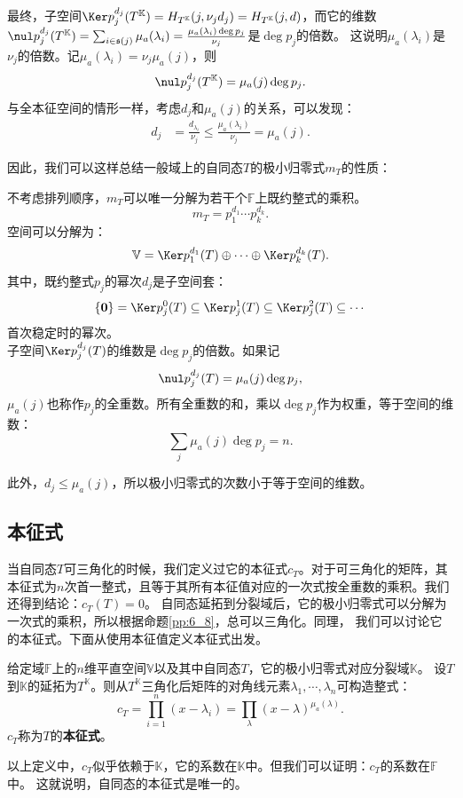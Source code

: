 \documentclass[12pt,UTF8]{ctexbook}
\begin{document}
最终，子空间$\Ker p_j^{d_j}(T^{\mathbb{K}}) = H_{T^{\mathbb{K}}}(j, \nu_j d_j) = H_{T^{\mathbb{K}}}(j, d)$，而它的维数
$\nul p_j^{d_j}(T^{\mathbb{K}}) = \sum_{i\in \mathfrak{s}(j)} \mu_a(\lambda_i) = \frac{\mu_a(\lambda_i) \deg p_j}{\nu_j} $是$\deg p_j$的倍数。
这说明$\mu_a(\lambda_i)$是$\nu_j$的倍数。记$\mu_a(\lambda_i) = \nu_j \mu_a(j)$，则
$$ \nul p_j^{d_j}(T^{\mathbb{K}}) = \mu_a(j) \deg p_j. $$
与全本征空间的情形一样，考虑$d_j$和$\mu_a(j)$的关系，可以发现：
\begin{align*}
    d_j &= \frac{d_{\lambda_i}}{\nu_j} \leqslant \frac{\mu_a(\lambda_i)}{\nu_j} = \mu_a(j).  
\end{align*}

因此，我们可以这样总结一般域上的自同态$T$的极小归零式$m_T$的性质：
\begin{pp}\label{pp:9_7_1}
不考虑排列顺序，$m_T$可以唯一分解为若干个$\mathbb{F}$上既约整式的乘积。
$$ m_T = p_1^{d_1}\cdots p_k^{d_k}.$$
空间可以分解为：
$$ \mathbb{V} = \Ker p_1^{d_1}(T) \oplus \cdots \oplus \Ker p_k^{d_k}(T). $$
其中，既约整式$p_j$的幂次$d_j$是子空间套：
$$ \{\mathbf{0}\} = \Ker p_j^{0}(T) \subseteq \Ker p_j^{1}(T) \subseteq \Ker p_j^{2}(T) \subseteq \cdots $$
首次稳定时的幂次。\\
子空间$\Ker p_j^{d_j}(T)$的维数是$\deg p_j$的倍数。如果记
$$ \nul p_j^{d_j}(T) = \mu_a(j) \deg p_j, $$
$\mu_a(j)$也称作$p_j$的全重数。所有全重数的和，乘以$\deg p_j$作为权重，等于空间的维数：
$$ \sum_j \mu_a(j) \deg p_j = n . $$
\end{pp}

此外，$d_j  \leqslant \mu_a(j) $，所以极小归零式的次数小于等于空间的维数。

\subsection{本征式}
当自同态$T$可三角化的时候，我们定义过它的本征式$c_T$。对于可三角化的矩阵，其本征式为$n$次首一整式，且等于其所有本征值对应的一次式按全重数的乘积。我们还得到结论：$c_T(T) = 0$。
自同态延拓到分裂域后，它的极小归零式可以分解为一次式的乘积，所以根据命题\ref{pp:6_8}，总可以三角化。同理，
我们可以讨论它的本征式。下面从使用本征值定义本征式出发。

\begin{df}\label{df:9_5}
    给定域$\mathbb{F}$上的$n$维平直空间$\mathbb{V}$以及其中自同态$T$，它的极小归零式对应分裂域$\mathbb{K}$。
    设$T$到$\mathbb{K}$的延拓为$T^{\mathbb{K}}$。则从$T^{\mathbb{K}}$三角化后矩阵的对角线元素$\lambda_1, \cdots , \lambda_n$可构造整式：
    $$ c_T = \prod_{i=1}^n (x - \lambda_i) = \prod_{\lambda} (x - \lambda)^{\mu_a(\lambda)}.$$
    $c_T$称为$T$的\textbf{本征式}。
\end{df}
以上定义中，$c_T$似乎依赖于$\mathbb{K}$，它的系数在$\mathbb{K}$中。但我们可以证明：$c_T$的系数在$\mathbb{F}$中。
这就说明，自同态的本征式是唯一的。
\end{document}
